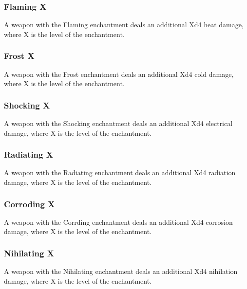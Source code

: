 \subsubsection{Flaming X}\label{enchantment:Flaming}
A weapon with the Flaming enchantment deals an additional Xd4 heat damage, where X is the level of the enchantment.

\subsubsection{Frost X}\label{enchantment:Frost}
A weapon with the Frost enchantment deals an additional Xd4 cold damage, where X is the level of the enchantment.

\subsubsection{Shocking X}\label{enchantment:Shocking}
A weapon with the Shocking enchantment deals an additional Xd4 electrical damage, where X is the level of the enchantment.

\subsubsection{Radiating X}\label{enchantment:Radiating}
A weapon with the Radiating enchantment deals an additional Xd4 radiation damage, where X is the level of the enchantment.

\subsubsection{Corroding X}\label{enchantment:Corroding}
A weapon with the Corrding enchantment deals an additional Xd4 corrosion damage, where X is the level of the enchantment.

\subsubsection{Nihilating X}\label{enchantment:Nihilating}
A weapon with the Nihilating enchantment deals an additional Xd4 nihilation damage, where X is the level of the enchantment.

